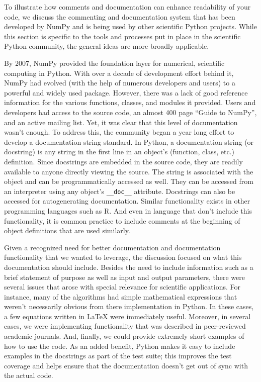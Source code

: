 \documentclass[ChapterTOCs,krantz2]{krantz} %
\theoremstyle{definition}
\begin{document}
To illustrate how comments and documentation can enhance readability of your
code, we discuss the commenting and documentation system that has been
developed by NumPy and is being used by other scientific Python projects. While
this section is specific to the tools and processes put in place in the
scientific Python community, the general ideas are more broadly applicable.

By 2007, NumPy provided the foundation layer for numerical, scientific
computing in Python. With over a decade of development effort behind it, NumPy
had evolved (with the help of numerous developers and users) to a powerful and
widely used package. However, there was a lack of good reference information
for the various functions, classes, and modules it provided. Users and
developers had access to the source code, an almost 400 page ``Guide to
NumPy'', and an active mailing list. Yet, it was clear that this level of
documentation wasn't enough. To address this, the community began a year long
effort to develop a documentation string standard. In Python, a documentation
string (or docstring) is any string in the first line in an object's (function,
class, etc.) definition. Since docstrings are embedded in the source code, they
are readily available to anyone directly viewing the source. The string is
associated with the object and can be programmatically accessed as well.  They
can be accessed from an interpreter using any object's \texttt{\_\_doc\_\_}
attribute.  Docstrings can also be accessed for autogenerating documentation.
Similar functionality exists in other programming languages such as R. And even
in language that don't include this functionality, it is common practice to
include comments at the beginning of object definitions that are used
similarly.

Given a recognized need for better documentation and documentation
functionality that we wanted to leverage, the discussion focused on what this
documentation should include. Besides the need to include information such as a
brief statement of purpose as well as input and output parameters, there were
several issues that arose with special relevance for scientific applications.
For instance, many of the algorithms had simple mathematical expressions that
weren't necessarily obvious from there implementation in Python. In these
cases, a few equations written in \LaTeX{} were immediately useful. Moreover,
in several cases, we were implementing functionality that was described in
peer-reviewed academic journals. And, finally, we could provide extremely
short examples of how to use the code. As an added benefit, Python makes it
easy to include examples in the docstrings as part of the test suite; this
improves the test coverage and helps ensure that the documentation doesn't get
out of sync with the actual code.
\end{document}
